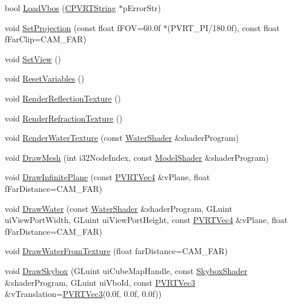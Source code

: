 \begin{DoxyCompactItemize}
bool \hyperlink{class_o_g_l_e_s3_water_a953fd61022b19c16e3bfdc897f74a1ef}{Load\+Vbos} (\hyperlink{class_c_p_v_r_t_string}{C\+P\+V\+R\+T\+String} $\ast$p\+Error\+Str)
\item 
void \hyperlink{class_o_g_l_e_s3_water_a68c0c0f26e937fad98a108fe16ef3989}{Set\+Projection} (const float f\+F\+O\+V=60.\+0f $\ast$(\+P\+V\+R\+T\+\_\+\+P\+I/180.\+0f), const float f\+Far\+Clip=\+C\+A\+M\+\_\+\+F\+A\+R)
\item 
void \hyperlink{class_o_g_l_e_s3_water_a3ef2b92aa2c942fca58dd5195ba2a48c}{Set\+View} ()
\item 
void \hyperlink{class_o_g_l_e_s3_water_a583e58e2b6d929315a4e1f41905298e5}{Reset\+Variables} ()
\item 
void \hyperlink{class_o_g_l_e_s3_water_ac7bbade3e3a4e1a4faf5881e587a4a03}{Render\+Reflection\+Texture} ()
\item 
void \hyperlink{class_o_g_l_e_s3_water_a82d3d0aaaa0ab9cb96ccbecbb9c3d5d7}{Render\+Refraction\+Texture} ()
\item 
void \hyperlink{class_o_g_l_e_s3_water_a4c980acbf527a3d7b67a69147098fcf0}{Render\+Water\+Texture} (const \hyperlink{struct_water_shader}{Water\+Shader} \&shader\+Program)
\item 
void \hyperlink{class_o_g_l_e_s3_water_a13f91a190b3395df1cbf7131aaa86753}{Draw\+Mesh} (int i32\+Node\+Index, const \hyperlink{struct_model_shader}{Model\+Shader} \&shader\+Program)
\item 
void \hyperlink{class_o_g_l_e_s3_water_a8adccbbd77d86015388d4f631b608056}{Draw\+Infinite\+Plane} (const \hyperlink{struct_p_v_r_t_vec4}{P\+V\+R\+T\+Vec4} \&v\+Plane, float f\+Far\+Distance=C\+A\+M\+\_\+\+F\+A\+R)
\item 
void \hyperlink{class_o_g_l_e_s3_water_a02ee6786ce99e7d574579142119335bf}{Draw\+Water} (const \hyperlink{struct_water_shader}{Water\+Shader} \&shader\+Program, G\+Luint ui\+View\+Port\+Width, G\+Luint ui\+View\+Port\+Height, const \hyperlink{struct_p_v_r_t_vec4}{P\+V\+R\+T\+Vec4} \&v\+Plane, float f\+Far\+Distance=C\+A\+M\+\_\+\+F\+A\+R)
\item 
void \hyperlink{class_o_g_l_e_s3_water_ad3d5c999cb26d7462682b138dc097b5a}{Draw\+Water\+From\+Texture} (float far\+Distance=C\+A\+M\+\_\+\+F\+A\+R)
\item 
void \hyperlink{class_o_g_l_e_s3_water_a2cf141c8c4f4dabf478f146811ef95ff}{Draw\+Skybox} (G\+Luint ui\+Cube\+Map\+Handle, const \hyperlink{struct_skybox_shader}{Skybox\+Shader} \&shader\+Program, G\+Luint ui\+Vbo\+Id, const \hyperlink{struct_p_v_r_t_vec3}{P\+V\+R\+T\+Vec3} \&v\+Translation=\hyperlink{struct_p_v_r_t_vec3}{P\+V\+R\+T\+Vec3}(0.\+0f, 0.\+0f, 0.\+0f))

\end{DoxyCompactItemize}
